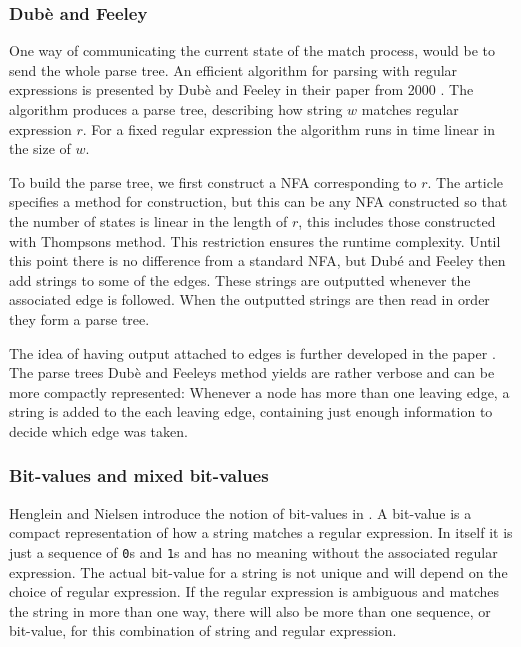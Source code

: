 \subsubsection{Dubè and Feeley}
One way of communicating the current state of the match process, would
be to send the whole parse tree. An efficient algorithm for parsing
with regular expressions is presented by Dubè and Feeley in their
paper from 2000 \cite{Dube2000}. The algorithm produces a parse tree,
describing how string $w$ matches regular expression $r$. For a fixed
regular expression the algorithm runs in time linear in the size of
$w$.

To build the parse tree, we first construct a NFA corresponding to
$r$. The article specifies a method for construction, but this can be
any NFA constructed so that the number of states is linear in the
length of $r$, this includes those constructed with Thompsons method\cite{Thompson1968}. This restriction ensures the runtime
complexity. Until this point there is no difference from a standard
NFA, but Dubé and Feeley then add strings to some of the edges. These
strings are outputted whenever the associated edge is followed. When
the outputted strings are then read in order they form a parse tree.

The idea of having output attached to edges is further developed in
the paper \cite{Henglein2010}. The parse trees Dubè and Feeleys method
yields are rather verbose and can be more compactly represented:
Whenever a node has more than one leaving edge, a string is added to
the each leaving edge, containing just enough information to decide which
edge was taken.


\subsubsection{Bit-values and mixed bit-values}

Henglein and Nielsen introduce the notion of bit-values in
\cite{Henglein2010}. A bit-value is a compact representation of how a
string matches a regular expression. In itself it is just a sequence of
\texttt{0}s and \texttt{1}s and has no meaning without the associated
regular expression. The actual bit-value for a string is not unique
and will depend on the choice of regular expression. If the regular
expression is ambiguous and matches the string in more than one way,
there will also be more than one sequence, or bit-value, for this combination of string and regular
expression. 

